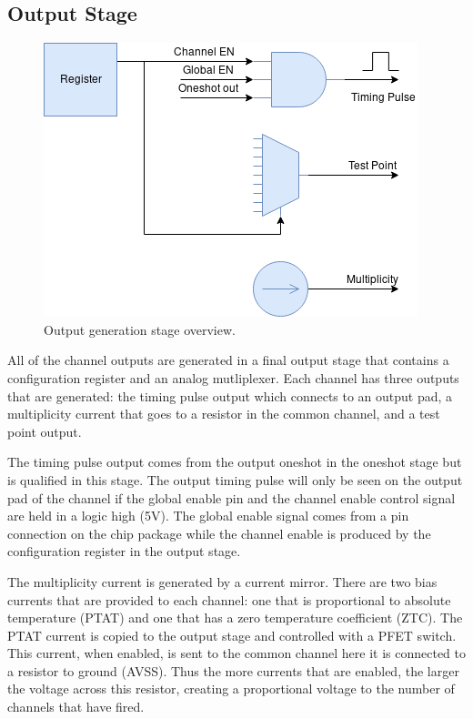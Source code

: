 \documentclass[12pt,oneside,final]{siuethesis}
\theoremstyle{definition}
\begin{document}
\subsection{Output Stage}
\begin{figure}[ht]
\centering
\includegraphics[scale=.6,keepaspectratio=true]{images/output_stage.png} 
\caption{Output generation stage overview.}
\label{fig:output-stage}
\end{figure}
\par All of the channel outputs are generated in a final output stage that contains a configuration register and an analog mutliplexer. Each channel has three outputs that are generated: the timing pulse output which connects to an output pad, a multiplicity current that goes to a resistor in the common channel, and a test point output.
\par The timing pulse output comes from the output oneshot in the oneshot stage but is qualified in this stage. The output timing pulse will only be seen on the output pad of the channel if the global enable pin and the channel enable control signal are held in a logic high (5V). The global enable signal comes from a pin connection on the chip package while the channel enable is produced by the configuration register in the output stage.
\par The multiplicity current is generated by a current mirror. There are two bias currents that are provided to each channel: one that is proportional to absolute temperature (PTAT) and one that has a zero temperature coefficient (ZTC). The PTAT current is copied to the output stage and controlled with a PFET switch. This current, when enabled, is sent to the common channel here it is connected to a resistor to ground (AVSS). Thus the more currents that are enabled, the larger the voltage across this resistor, creating a proportional voltage to the number of channels that have fired.
\end{document}
